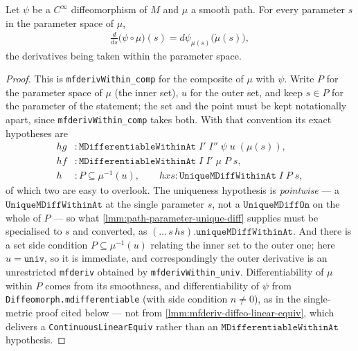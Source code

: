 \begin{lemma}
    \label{lmm:cross-metric-pushforward-path-tangent}
    \leanok
    Let $\psi$ be a $C^\infty$ diffeomorphism of $M$ and $\mu$ a smooth path. For every parameter $s$ in the parameter space of $\mu$,
    \begin{align}
        \tfrac{d}{ds}\big(\psi \circ \mu\big)(s) = d\psi_{\mu(s)}\big(\dot\mu(s)\big),
    \end{align}
    the derivatives being taken within the parameter space.
\end{lemma}
\begin{proof}
    \leanok
    This is \texttt{mfderivWithin\_comp} for the composite of $\mu$ with $\psi$. Write $P$ for the parameter space of $\mu$ (the inner set), $u$ for the outer set, and keep $s \in P$ for the parameter of the statement; the set and the point must be kept notationally apart, since \texttt{mfderivWithin\_comp} takes both. With that convention its exact hypotheses are
    \begin{align}
        hg &: \mathtt{MDifferentiableWithinAt}\;I'\;I''\;\psi\;u\;(\mu(s)), \\
        hf &: \mathtt{MDifferentiableWithinAt}\;I\;I'\;\mu\;P\;s, \\
        h &: P \subseteq \mu^{-1}(u), \qquad hxs : \mathtt{UniqueMDiffWithinAt}\;I\;P\;s,
    \end{align}
    of which two are easy to overlook. The uniqueness hypothesis is \emph{pointwise} --- a $\mathtt{UniqueMDiffWithinAt}$ at the single parameter $s$, not a $\mathtt{UniqueMDiffOn}$ on the whole of $P$ --- so what \ref{lmm:path-parameter-unique-diff} supplies must be specialised to $s$ and converted, as $(\dots\,s\,hs).\mathtt{uniqueMDiffWithinAt}$. And there is a set side condition $P \subseteq \mu^{-1}(u)$ relating the inner set to the outer one; here $u = \mathtt{univ}$, so it is immediate, and correspondingly the outer derivative is an unrestricted \texttt{mfderiv} obtained by \texttt{mfderivWithin\_univ}. Differentiability of $\mu$ within $P$ comes from its smoothness, and differentiability of $\psi$ from \texttt{Diffeomorph.mdifferentiable} (with side condition $n \neq 0$), as in the single-metric proof cited below --- not from \ref{lmm:mfderiv-diffeo-linear-equiv}, which delivers a \texttt{ContinuousLinearEquiv} rather than an $\mathtt{MDifferentiableWithinAt}$ hypothesis.


\end{proof}
